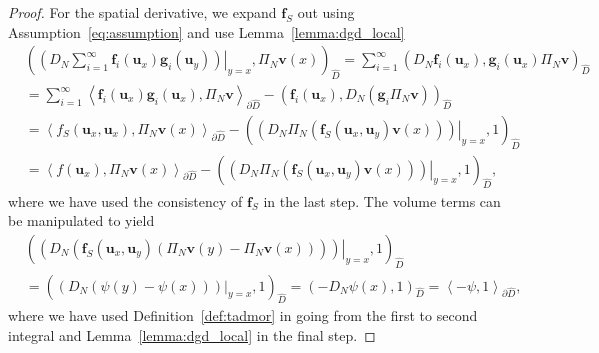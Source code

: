 \documentclass[preprint,10pt]{article}
\theoremstyle{definition}
\theoremstyle{lemma}
\theoremstyle{theorem}
\theoremstyle{assumption}
\newcommand{\pd}[2]{\frac{\partial#1}{\partial#2}}
\newcommand{\LRp}[1]{\left( #1 \right)}
\newcommand{\LRa}[1]{\left\langle #1 \right\rangle}
\begin{document}
\begin{proof}
For the spatial derivative, we expand $\bm{f}_S$ out using Assumption~\ref{eq:assumption} and use Lemma~\ref{lemma:dgd_local}
\begin{align*}
&\LRp{\left.\LRp{D_N \sum_{i=1}^{\infty}\bm{f}_i(\bm{u}_x)\bm{g}_i(\bm{u}_y)}\right|_{y=x}, \Pi_N\bm{v}(x)}_{\widehat{D}} = \sum_{i=1}^{\infty} \LRp{{D_N \bm{f}_i(\bm{u}_x)}, {\bm{g}_i(\bm{u}_x)\Pi_N\bm{v} }}_{\widehat{D}}\\
&= \sum_{i=1}^{\infty}\LRa{\bm{f}_i(\bm{u}_x) \bm{g}_i(\bm{u}_x),\Pi_N\bm{v}}_{\partial \widehat{D}}  - \LRp{ \bm{f}_i(\bm{u}_x), D_N \LRp{\bm{g}_i\Pi_N\bm{v} }}_{\widehat{D}}\\
&= \LRa{f_S(\bm{u}_x,\bm{u}_x), \Pi_N\bm{v}(x)}_{\partial \widehat{D}}  - \LRp{\left.\LRp{D_N \Pi_N\LRp{\bm{f}_S(\bm{u}_x,\bm{u}_y)\bm{v}(x)} }\right|_{y=x},1}_{\widehat{D}}\\
&= \LRa{f(\bm{u}_x), \Pi_N\bm{v}(x)}_{\partial \widehat{D}}  - \LRp{\left.\LRp{D_N \Pi_N\LRp{\bm{f}_S(\bm{u}_x,\bm{u}_y)\bm{v}(x)} }\right|_{y=x},1}_{\widehat{D}},
\end{align*}
where we have used the consistency of $\bm{f}_S$ in the last step.  
The volume terms can be manipulated to yield
\begin{align*}
&\LRp{\left.\LRp{D_N \LRp{\bm{f}_S(\bm{u}_x,\bm{u}_y)\LRp{\Pi_N\bm{v}(y)-\Pi_N\bm{v}(x)} }}\right|_{y=x},1}_{\widehat{D}} \\
&= \LRp{ \left.\LRp{D_N\LRp{\psi(y)-\psi(x) }}\right|_{y=x},1}_{\widehat{D}} = \LRp{-D_N \psi(x),1}_{\widehat{D}} = \LRa{-\psi,1}_{\partial \widehat{D}},
\end{align*}
where we have used Definition~\ref{def:tadmor} in going from the first to second integral and Lemma~\ref{lemma:dgd_local} in the final step.  

\end{proof}
\end{document}
